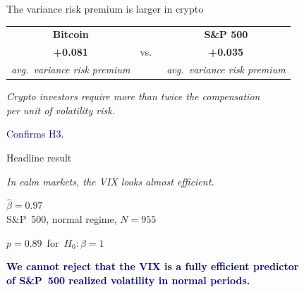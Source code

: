\documentclass[aspectratio=169,11pt]{beamer}
\begin{document}
\begin{frame}{The variance risk premium is larger in crypto}
  \vspace*{8mm}
  \begin{center}
    \begin{tabular}{ccc}
      \textbf{Bitcoin} & & \textbf{S\&P 500} \\[2mm]
      {\fontsize{42}{50}\selectfont\color{navy}\textbf{+0.081}} & \quad vs.\ \quad &
      {\fontsize{42}{50}\selectfont\color{navy}\textbf{+0.035}} \\[2mm]
      {\small\itshape avg.\ variance risk premium} & & {\small\itshape avg.\ variance risk premium} \\
    \end{tabular}
  \end{center}
  \vspace*{8mm}
  \begin{center}
    {\itshape Crypto investors require more than twice the compensation\\
    per unit of volatility risk.}\par
    \vspace*{2mm}
    \textcolor{navy}{Confirms H3.}
  \end{center}
\end{frame}

\begin{frame}{Headline result}
  \vspace*{3mm}
  \begin{center}
    {\small\itshape In calm markets, the VIX looks almost efficient.}
  \end{center}
  \vspace*{4mm}
  \begin{center}
    {\fontsize{44}{52}\selectfont\color{navy}\textbf{$\hat\beta = 0.97$}}\\[2mm]
    {\normalsize S\&P~500, normal regime, $N = 955$}
  \end{center}
  \vspace*{6mm}
  \begin{center}
    {\large $p = 0.89$\, for\, $H_0:\beta = 1$}
  \end{center}
  \vspace*{6mm}
  \begin{center}
    \textcolor{navy}{\bfseries We cannot reject that the VIX is a fully efficient predictor\\
    of S\&P~500 realized volatility in normal periods.}
  \end{center}
\end{frame}
\end{document}
